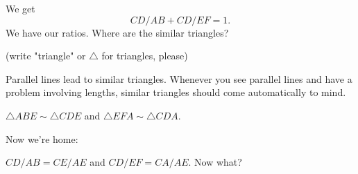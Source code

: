 


We get $$CD/AB + CD/EF = 1.$$We have our ratios. Where are the similar triangles?

(write "triangle" or $\triangle$ for triangles, please)









Parallel lines lead to similar triangles. Whenever you see parallel lines and have a problem involving lengths, similar triangles should come automatically to mind.

$\triangle ABE \sim \triangle CDE$ and $\triangle EFA \sim \triangle CDA.$

Now we're home:

$CD/AB = CE/AE$ and $CD/EF = CA/AE.$ Now what?



